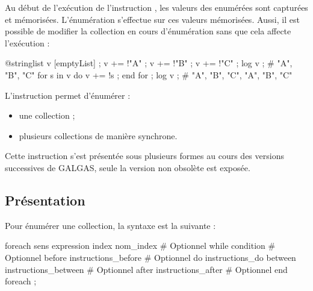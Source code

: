 Au début de l'exécution de l'instruction , les valeurs des  enumérées sont capturées et mémorisées. L'énumération s'effectue sur ces valeurs mémorisées. Aussi, il est possible de modifier la collection en cours d'énumération sans que cela affecte l'exécution :
\begin{galgascode}
@stringlist v [emptyList] ;
v += !"A" ;
v += !"B" ;
v += !"C" ;
log v ; # "A", "B", "C"
for s in v do
  v += !s ;
end for ;
log v ; # "A", "B", "C", "A", "B", "C"
\end{galgascode}



















L'instruction  permet d'énumérer :
\begin{itemize}
  \item une collection ;
  \item plusieurs collections de manière synchrone.
\end{itemize}

Cette instruction s'est présentée sous plusieurs formes au cours des versions successives de GALGAS, seule la version non obsolète est exposée.

\subsection{Présentation}

Pour énumérer une collection, la syntaxe est la suivante :

\begin{galgascode}
foreach sens expression
index nom_index # Optionnel
while condition # Optionnel
before instructions_before  # Optionnel
do instructions_do
between instructions_between  # Optionnel
after instructions_after  # Optionnel
end foreach ;
\end{galgascode}


